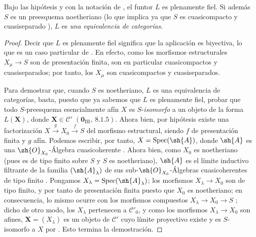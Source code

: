 \begin{proposition}[8.13.5]
\label{IV.8.13.5}
Bajo las hipótesis y con la notación de , el funtor $L$ es plenamente fiel.
Si además $S$ es un preesquema noetheriano (lo que implica ya que $S$ es cuasicompacto y cuasiseparado ), $L$ es \emph{una equivalencia de categorías}.
\end{proposition}

\begin{proof}
Decir que $L$ es plenamente fiel significa que la aplicación  es biyectiva, lo que es un caso particular de .
En efecto, como los morfismos estructurales $X_\mu\to S$ son de presentación finita, son en particular cuasicompactos y cuasiseparados; por tanto, los $X_\mu$ son cuasicompactos y cuasiseparados.

Para demostrar que, cuando $S$ es noetheriano, $L$ es una equivalencia de categorías, basta, puesto que ya sabemos que $L$ es plenamente fiel, probar que todo $S$-preesquema esencialmente afín $X$ es $S$-\emph{isomorfo} a un objeto de la forma $L(\mathbf{X})$, donde $\mathbf{X}\in\mathcal{C}'$ $(\mathbf{0}_{\text{III}},~8.1.5)$.
Ahora bien, por hipótesis existe una factorización $X\xrightarrow{g}X_0\xrightarrow{f}S$ del morfismo estructural, siendo $f$ de presentación finita y $g$ afín.
Podemos escribir, por tanto, $X=\operatorname{Spec}(\sh{A})$, donde $\sh{A}$ es una $\sh{O}_{X_0}$-Álgebra cuasicoherente .
Ahora bien, como $X_0$ es noetheriano (pues es de tipo finito sobre $S$ y $S$ es noetheriano), $\sh{A}$ es el límite inductivo filtrante de la familia $(\sh{A}_\lambda)$ de sus sub-$\sh{O}_{X_0}$-Álgebras cuasicoherentes de tipo finito .
Pongamos $X_\lambda=\operatorname{Spec}(\sh{A}_\lambda)$; los morfismos $X_\lambda\to X_0$ son de tipo finito, y por tanto de presentación finita puesto que $X_0$ es noetheriano; en consecuencia, lo mismo ocurre con los morfismos compuestos $X_\lambda\to X_0\to S$ ; dicho de otro modo, los $X_\lambda$ pertenecen a $\mathcal{C}'_0$, y como los morfismos $X_\lambda\to X_0$ son afines, $\mathbf{X}=(X_\lambda)$ es un objeto de $\mathcal{C}'$ cuyo límite proyectivo existe y es $S$-isomorfo a $X$ por .
Esto termina la demostración.
\end{proof}

